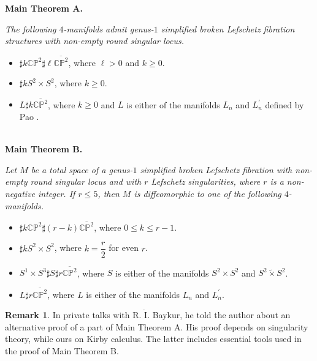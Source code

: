 \documentclass{amsart}
\theoremstyle{plain}
\theoremstyle{definition}
\newtheorem{rem}[thm]{Remark}
\begin{document}
\noindent
{\bf Main Theorem A.} {\it 
The following $4$-manifolds admit genus-$1$ simplified broken Lefschetz fibration structures with non-empty round singular locus. 

\begin{itemize}

\item $\sharp k\mathbb{CP}^2\sharp \ell\overline{\mathbb{CP}^2}$, where $\ell>0$ and $k\geq 0$. 

\item $\sharp kS^2\times S^2$, where $k\geq 0$. 

\item $L\sharp k\overline{\mathbb{CP}^2}$, where $k\geq 0$ and $L$ is either of the manifolds $L_n$ and $L_n^{\prime}$ defined by Pao \cite{Pao}. 

\end{itemize}}
\noindent
\\[-10pt]
{\bf Main Theorem B.} {\it
Let $M$ be a total space of a genus-$1$ simplified broken Lefschetz fibration with non-empty round singular locus and with $r$ Lefschetz singularities, where $r$ is a non-negative integer. 
If $r\leq 5$, then $M$ is diffeomorphic to one of the following $4$-manifolds. 

\begin{itemize}

\item $\sharp k\mathbb{CP}^2\sharp(r-k)\overline{\mathbb{CP}^2}$, where $0\leq k \leq r-1$. 

\item $\sharp kS^2\times S^2$, where $k=\dfrac{r}{2}$ for even $r$. 

\item $S^1\times S^3\sharp S\sharp r\overline{\mathbb{CP}^2}$, where $S$ is either of the manifolds $S^2\times S^2$ and $S^2\tilde{\times}S^2$. 

\item $L\sharp r\overline{\mathbb{CP}^2}$, where $L$ is either of the manifolds $L_n$ and $L_n^{\prime}$. 

\end{itemize}}

\begin{rem}

In private talks with R. $\dot{\text{I}}$. Baykur, he told the author about an alternative proof of a part of Main Theorem A. 
His proof depends on singularity theory, while ours on Kirby calculus. 
The latter includes essential tools used in the proof of Main Theorem B. 

\end{rem}
\end{document}
